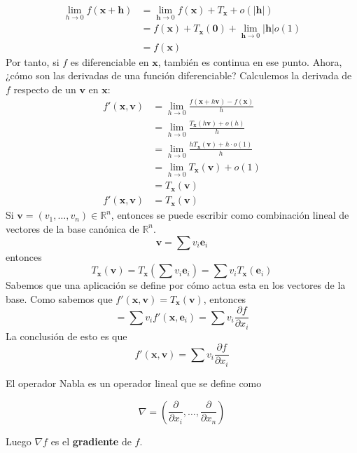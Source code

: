 \documentclass{./Calculo.tex}
\begin{document}
\begin{equation}
	\begin{split}
\lim_{ h \to 0 } f(\mathbf{x}+\mathbf{h})&=\lim_{ \mathbf{h} \to 0 } f(\mathbf{x})+T_{\mathbf{x}}+o(|\mathbf{h}|)\\
&=f(\mathbf{x})+T_{\mathbf{x}}(\mathbf{0})+\lim_{ \mathbf{h} \to 0 } |\mathbf{h}|o(1)\\
&=f(\mathbf{x})
	\end{split}
\end{equation}
Por tanto, si $f$ es diferenciable en $\mathbf{x}$, también es continua en ese punto.
Ahora, ¿cómo son las derivadas de una función diferenciable?
Calculemos la derivada de $f$ respecto de un $\mathbf{v}$ en $\mathbf{x}$:
\begin{equation}
	\begin{split}
f'(\mathbf{x},\mathbf{v})&= \lim_{ h \to 0 } \frac{f(\mathbf{x}+h\mathbf{v})-f(\mathbf{x})}{h}\\
&=\lim_{ h \to 0 } \frac{T_{\mathbf{x}}(h\mathbf{v})+o(h)}{h}\\
&=\lim_{ h \to 0 } \frac{hT_{\mathbf{x}}(\mathbf{v})+h\cdot o(1)}{h}\\
&=\lim_{ h \to 0 } T_{\mathbf{x}}(\mathbf{v})+o(1)\\
&=T_{\mathbf{x}}(\mathbf{v})\\
f'(\mathbf{x},\mathbf{v})&=T_{\mathbf{x}}(\mathbf{v})
	\end{split}
\end{equation}
Si $\mathbf{v}=(v_{1},\dots,v_{n})\in \mathbb{R}^{n}$, entonces se puede escribir como combinación lineal de vectores de la base canónica de $\mathbb{R}^{n}$.
$$
\mathbf{v}=\sum v_{i}\mathbf{e}_{i}
$$
entonces
$$
T_{\mathbf{x}}(\mathbf{v})=T_{\mathbf{x}}\left( \sum v_{i}\mathbf{e}_{i} \right)=\sum v_{i}T_{\mathbf{x}}(\mathbf{e}_{i})
$$
Sabemos que una aplicación se define por cómo actua esta en los vectores de la base. Como sabemos que $f'(\mathbf{x},\mathbf{v})=T_{\mathbf{x}}(\mathbf{v})$, entonces
$$
=\sum v_{i}f'(\mathbf{x},\mathbf{e}_{i})=\sum v_{i} \frac{ \partial f }{ \partial x_{i} }
$$
La conclusión de esto es que
$$
\boxed{f'(\mathbf{x},\mathbf{v})=\sum v_{i} \frac{ \partial f }{ \partial x_{i} } }
$$
\begin{defin}
El operador Nabla es un operador lineal que se define como
 
$$
\nabla = \left( \frac{ \partial  }{ \partial x_{i} },\dots,\frac{ \partial  }{ \partial x_{n} }   \right)
$$
 
Luego $\nabla f$ es el \textbf{gradiente} de $f$.
\end{defin}
\end{document}
